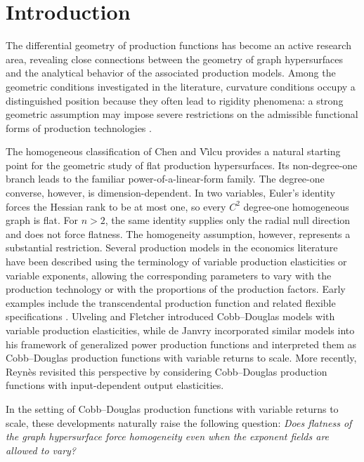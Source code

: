 \documentclass[12pt]{amsart}
\begin{document}
\maketitle

\section{Introduction}\label{S1}

The differential geometry of production functions has become an active
research area, revealing close connections between the geometry of graph
hypersurfaces and the analytical behavior of the associated production models.
Among the geometric conditions investigated in the literature, curvature conditions occupy a distinguished position because they often lead to rigidity phenomena: a strong geometric assumption may impose
severe restrictions on the admissible functional forms of production
technologies \cite{ACDV,AE2,AM,CS,CH2,CH4,CDV14,CVVMJM,DecuV,Du,FuLuo,FW,Luo,Luo2025,NTV,VV,VV3,VGE}.

The homogeneous classification of Chen and V\^\i lcu \cite{CV2013} provides a natural starting point for the geometric study of flat production hypersurfaces. Its non-degree-one branch leads to the familiar power-of-a-linear-form family. The degree-one converse, however, is dimension-dependent. In two variables, Euler's identity forces the Hessian rank to be at most one, so every $C^2$ degree-one homogeneous graph is flat. For $n>2$, the same identity supplies only the radial null direction and does not force flatness. The homogeneity assumption, however, represents a substantial
restriction. Several production models in the economics literature have
been described using the terminology of variable production elasticities
or variable exponents, allowing the corresponding parameters to vary with
the production technology or with the proportions of the production
factors. Early
examples include the transcendental production function and related
flexible specifications \cite{Halter}. Ulveling and Fletcher
\cite{Ulveling} introduced Cobb--Douglas models with variable production
elasticities, while de Janvry \cite{Janvry} incorporated similar models
into his framework of generalized power production functions and
interpreted them as Cobb--Douglas production functions with variable
returns to scale. More recently, Reyn\`es \cite{Rey} revisited this
perspective by considering Cobb--Douglas production functions with
input-dependent output elasticities.

In the setting of Cobb--Douglas production functions with variable
returns to scale, these developments naturally raise the following
question:
\emph{Does flatness of the graph hypersurface force homogeneity
even when the exponent fields are allowed to vary?}
\end{document}
